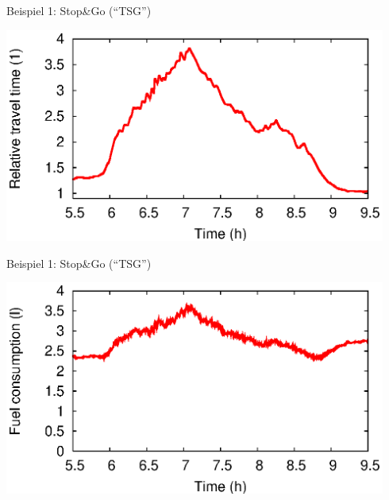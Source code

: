 \documentclass[a4paper]{foils}
\begin{document}
\begin{landscape}
\begin{center}
\newpage
\centerline{Beispiel 1: Stop\&Go (``TSG'')}

\hspace{0.11\textwidth}
\includegraphics[width=0.94\textwidth]
 {figsAllg/F_0504_1.ASM.tseries.tt_delay.engl.eps}   

\newpage
\centerline{Beispiel 1: Stop\&Go (``TSG'')}

\hspace{0.11\textwidth}
\includegraphics[width=0.94\textwidth]
 {figsAllg/F_0504_1.ASM.tseries.fuel.engl.eps}   

\end{center}
\end{landscape}
\end{document}
